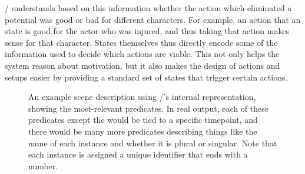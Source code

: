 \dunyazad/ understands based on this information whether the action which eliminated a potential was good or bad for different characters.
%
For example, an action that  an  state is good for the actor who was injured, and thus taking that action makes sense for that character.
%
States themselves thus directly encode some of the information used to decide which actions are viable.
%
This not only helps the system reason about motivation, but it also makes the design of actions and setups easier by providing a standard set of states that trigger certain actions.


\begin{figure}[!b]
\centering
\caption[\dunyazad/ State Example]{An example scene description using \dunyazad/'s internal representation, showing the most-relevant predicates. In real output, each of these predicates except the  would be tied to a specific timepoint, and there would be many more  predicates describing things like the name of each instance and whether it is plural or singular. Note that each instance is assigned a unique identifier that ends with a number.}
\label{fig:dunyazad-state-example}
\end{figure}


